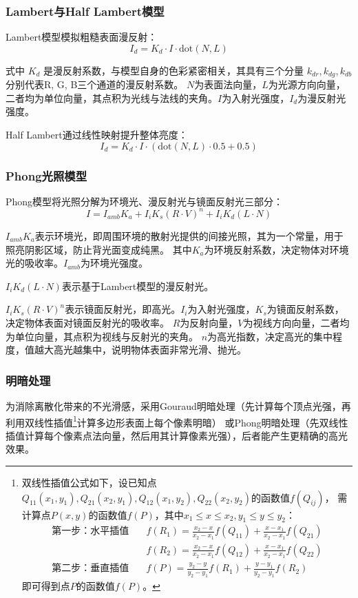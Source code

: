 \documentclass[12pt]{article}
\begin{document}
\subsubsection{Lambert与Half Lambert模型}
Lambert模型模拟粗糙表面漫反射：
\[
I_d = K_d \cdot I \cdot \text{dot}(N, L)
\]

式中 $K_d$ 是漫反射系数，与模型自身的色彩紧密相关，其具有三个分量 $k_{dr}, k_{dg}, k_{db}$ 分别代表R, G, B三个通道的漫反射系数。
$N$为表面法向量，$L$为光源方向向量，二者均为单位向量，其点积为光线与法线的夹角。$I$为入射光强度，$I_d$为漫反射光强度。

Half Lambert通过线性映射提升整体亮度：
\[
I_d = K_d \cdot I \cdot (\text{dot}(N,L) \cdot 0.5 + 0.5)
\]

\subsubsection{Phong光照模型}
Phong模型将光照分解为环境光、漫反射光与镜面反射光三部分：
\[
I = I_{amb} K_a + I_i K_s (R \cdot V)^n + I_i K_d (L \cdot N)
\]

$I_{amb} K_a$表示环境光，即周围环境的散射光提供的间接光照，其为一个常量，用于照亮阴影区域，防止背光面变成纯黑。
其中$K_a$为环境反射系数，决定物体对环境光的吸收率。$I_{amb}$为环境光强度。

$I_i K_d (L \cdot N)$表示基于Lambert模型的漫反射光。

$I_i K_s (R \cdot V)^n$表示镜面反射光，即高光。$I_i$为入射光强度，$K_s$为镜面反射系数，决定物体表面对镜面反射光的吸收率。
$R$为反射向量，$V$为视线方向向量，二者均为单位向量，其点积为视线与反射光的夹角。
$n$为高光指数，决定高光的集中程度，值越大高光越集中，说明物体表面非常光滑、抛光。

\subsubsection{明暗处理}
为消除离散化带来的不光滑感，采用Gouraud明暗处理（先计算每个顶点光强，再利用双线性插值\footnote{
    双线性插值公式如下，设已知点$Q_{11}(x_1,y_1), Q_{21}(x_2,y_1), Q_{12}(x_1,y_2), Q_{22}(x_2,y_2)$的函数值$f(Q_{ij})$，
    需计算点$P(x,y)$的函数值$f(P)$，其中$x_1 \le x \le x_2, y_1 \le y \le y_2$：
    \begin{align}
    \text{第一步：水平插值} \quad & f(R_1) = \frac{x_2 - x}{x_2 - x_1} f(Q_{11}) + \frac{x - x_1}{x_2 - x_1} f(Q_{21}) \\
    & f(R_2) = \frac{x_2 - x}{x_2 - x_1} f(Q_{12}) + \frac{x - x_1}{x_2 - x_1} f(Q_{22}) \\[6pt]
    \text{第二步：垂直插值} \quad & f(P) = \frac{y_2 - y}{y_2 - y_1} f(R_1) + \frac{y - y_1}{y_2 - y_1} f(R_2)
    \end{align}
    即可得到点$P$的函数值$f(P)$。
}计算多边形表面上每个像素明暗）
或Phong明暗处理（先双线性插值计算每个像素点法向量，然后用其计算像素光强），后者能产生更精确的高光效果。
\end{document}
